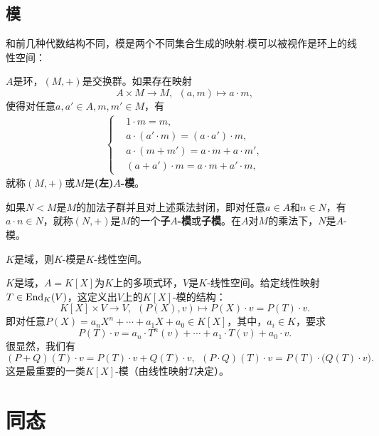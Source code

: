 \documentclass[lang=cn,10pt]{elegantbook}
\begin{document}
	\subsection{模}
	和前几种代数结构不同，模是两个不同集合生成的映射.模可以被视作是环上的线性空间：
	\begin{definition}[模]
		$A$是环，$(M,+)$是交换群。如果存在映射
		\[A\times M\rightarrow M,  \ \ (a,m)\mapsto a\cdot m,\]
		使得对任意$a,a'\in A,m,m'\in M$，有
		\begin{align*}
			\begin{cases}
				&1\cdot m=m, \\ 
				&a\cdot (a' \cdot m)=(a\cdot a')\cdot m,\\
				&a\cdot (m+m')=a\cdot m +a\cdot m', \\ 
				&(a+a')\cdot m=a\cdot m+a'\cdot m,
			\end{cases}
		\end{align*}
		就称$(M,+)$或$M$是{\bf (左)$A$-模}。
	\end{definition}
	\begin{definition}[子模]
			如果$N<M$是$M$的加法子群并且对上述乘法封闭，即对任意$a\in A$和$n\in N$，有$a\cdot n \in N$，就称$(N,+)$是$M$的一个{\bf 子$A$-模}或{\bf 子模}。在$A$对$M$的乘法下，$N$是$A$-模。
	\end{definition}
	\begin{example}
		$K$是域，则$K$-模是$K$-线性空间。
	\end{example}
	\begin{example}
		$K$是域，$A=K[X]$为$K$上的多项式环，$V$是$K$-线性空间。给定线性映射$T\in {\rm End}_{K}(V)$，这定义出$V$上的$K[X]$-模的结构：
		\[K[X]\times V\rightarrow V, \ \  (P(X), v)\mapsto P(X)\cdot v= P(T)\cdot v.\]
		即对任意$P(X)=a_nX^n+\cdots+a_1X +a_0\in K[X]$，其中，$a_i\in K$，要求
		\[P(T)\cdot v = a_n\cdot T^n(v)+\cdots+a_1\cdot T(v) +a_0\cdot v.\]
		很显然，我们有
		\[(P+Q)(T) \cdot v=P(T)\cdot v+Q(T)\cdot v , \ \ (P\cdot Q)(T)\cdot v=P(T)\cdot \big(Q(T)\cdot v\big).\]
		这是最重要的一类$K[X]$-模（由线性映射$T$决定）。
	\end{example}
	
	\section{同态}
\end{document}
